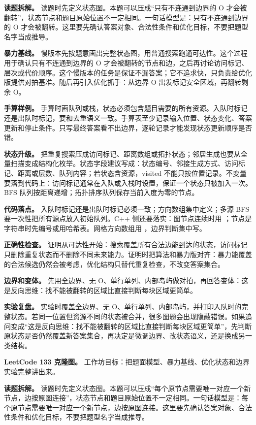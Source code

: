 \textbf{读题拆解。} 读题时先定义状态图。本题可以压成“只有不连通到边界的 O 才会被翻转”，状态节点和题目原始位置不一定相同。一句话模型是：只有不连通到边界的 O 才会被翻转。这里要先确认答案对象、合法性条件和优化目标，不要把题型名字当成推导。

\textbf{暴力基线。} 慢版本先按题意画出完整状态图，用普通搜索跑通可达性。这个过程用于确认只有不连通到边界的 O 才会被翻转的节点和边，之后再讨论访问标记、层次或代价顺序。这个慢版本的任务是保证不漏答案；它不追求快，只负责给优化版提供对拍基准。随后再引入优化抓手：从边界 O 出发标记安全区域，再翻转剩余 O。

\textbf{手算样例。} 手算时画队列或栈，状态必须包含题目需要的所有资源。入队时标记还是出队时标记，要和去重语义一致。手算表至少记录输入位置、状态变化、答案更新和停止条件。只写最终答案看不出边界，逐轮记录才能发现状态更新顺序是否错。

\textbf{状态升级。} 把重复搜索压成访问标记、距离数组或拓扑状态；邻居生成也要从全量扫描变成结构化枚举。状态字段建议写成：状态编号、邻接生成方式、访问标记、距离或层数、队列内容；若状态含资源，visited 不能只按位置记录。不变量要落到代码上：访问标记通常在入队或入栈时设置，保证一个状态只被加入一次。BFS 队列按距离递增；拓扑排序队列保存当前入度为零的节点。

\textbf{代码落点。} 入队时标记还是出队时标记必须一致；方向数组集中定义；多源 BFS 要一次性把所有源点放入初始队列。C++ 侧还要落实：图节点连续时用 ；节点是字符串时先编号或用哈希表。网格方向数组用 ，边界判断集中写。

\textbf{正确性检查。} 证明从可达性开始：搜索覆盖所有合法边能到达的状态，访问标记只删除重复状态而不删除不同未来能力。证明时把算法和暴力版对齐：暴力能覆盖的合法候选仍然会被考虑，优化结构只替代重复检查，不改变答案集合。

\textbf{边界和变体。} 先用全边界、无 O、单行单列、内部岛屿做对拍，再回答变体：这是反向思维：找不能被翻转的区域比直接判断每块区域更简单。

\textbf{实验复盘。} 实验时覆盖全边界、无 O、单行单列、内部岛屿，并打印入队时的完整状态。若同一位置但资源不同的状态被合并，很多图题会出现隐蔽错误。如果追问变成“这是反向思维：找不能被翻转的区域比直接判断每块区域更简单”，先判断原状态是否仍然覆盖新答案集合，再决定是微调边界、改状态语义，还是换成另一类结构。

\noindent\textbf{LeetCode 133 克隆图。} 工作坊目标：把题面模型、暴力基线、优化状态和边界实验完整讲出来。

\textbf{读题拆解。} 读题时先定义状态图。本题可以压成“每个原节点需要唯一对应一个新节点，边按原图连接”，状态节点和题目原始位置不一定相同。一句话模型是：每个原节点需要唯一对应一个新节点，边按原图连接。这里要先确认答案对象、合法性条件和优化目标，不要把题型名字当成推导。

